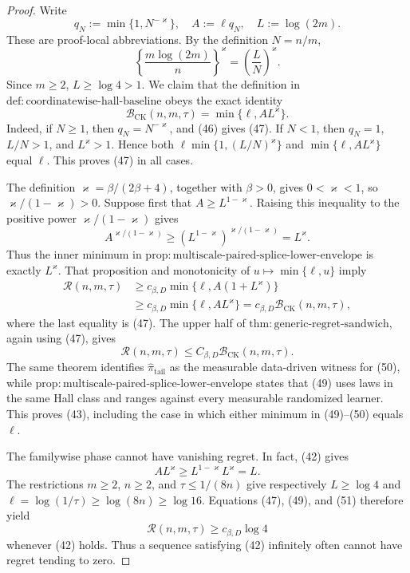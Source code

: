 \documentclass{article}
\begin{document}
\begin{proof}
Write
\[
q_N:=\min\{1,N^{-\varkappa}\},\quad
A:=\ell q_N,\quad L:=\log(2m).
\]
These are proof-local abbreviations. By the definition \(N=n/m\),
\[
\left\{\frac{m\log(2m)}n\right\}^{\varkappa}
=\left(\frac LN\right)^{\varkappa}.                                    \tag{46}
\]
Since \(m\geq2\), \(L\geq\log4>1\). We claim that the definition in \(\mathrm{def{:}coordinatewise\text{-}hall\text{-}baseline}\) obeys the exact identity
\[
\mathcal B_{\mathrm{CK}}(n,m,\tau)=\min\{\ell,AL^{\varkappa}\}.          \tag{47}
\]
Indeed, if \(N\geq1\), then \(q_N=N^{-\varkappa}\), and (46) gives (47). If \(N<1\), then \(q_N=1\), \(L/N>1\), and \(L^{\varkappa}>1\). Hence both
\(\ell\min\{1,(L/N)^{\varkappa}\}\) and \(\min\{\ell,AL^{\varkappa}\}\) equal \(\ell\). This proves (47) in all cases.

The definition \(\varkappa=\beta/(2\beta+4)\), together with \(\beta>0\), gives \(0<\varkappa<1\), so \(\varkappa/(1-\varkappa)>0\). Suppose first that \(A\geq L^{1-\varkappa}\). Raising this inequality to the positive power \(\varkappa/(1-\varkappa)\) gives
\[
A^{\varkappa/(1-\varkappa)}\geq
\left(L^{1-\varkappa}\right)^{\varkappa/(1-\varkappa)}=L^{\varkappa}.   \tag{48}
\]
Thus the inner minimum in \(\mathrm{prop{:}multiscale\text{-}paired\text{-}splice\text{-}lower\text{-}envelope}\) is exactly \(L^{\varkappa}\). That proposition and monotonicity of \(u\mapsto\min\{\ell,u\}\) imply
\[
\begin{split}
\mathcal R(n,m,\tau)
&\geq c_{\beta,D}\min\{\ell,A(1+L^{\varkappa})\}\\
&\geq c_{\beta,D}\min\{\ell,AL^{\varkappa}\}
=c_{\beta,D}\mathcal B_{\mathrm{CK}}(n,m,\tau),                       \tag{49}
\end{split}
\]
where the last equality is (47). The upper half of \(\mathrm{thm{:}generic\text{-}regret\text{-}sandwich}\), again using (47), gives
\[
\mathcal R(n,m,\tau)
\leq C_{\beta,D}\mathcal B_{\mathrm{CK}}(n,m,\tau).                    \tag{50}
\]
The same theorem identifies \(\widehat\pi_{\mathrm{tail}}\) as the measurable data-driven witness for (50), while \(\mathrm{prop{:}multiscale\text{-}paired\text{-}splice\text{-}lower\text{-}envelope}\) states that (49) uses laws in the same Hall class and ranges against every measurable randomized learner. This proves (43), including the case in which either minimum in (49)--(50) equals \(\ell\).

The familywise phase cannot have vanishing regret. In fact, (42) gives
\[
AL^{\varkappa}\geq L^{1-\varkappa}L^{\varkappa}=L.                     \tag{51}
\]
The restrictions \(m\geq2\), \(n\geq2\), and \(\tau\leq1/(8n)\) give respectively \(L\geq\log4\) and \(\ell=\log(1/\tau)\geq\log(8n)\geq\log16\). Equations (47), (49), and (51) therefore yield
\[
\mathcal R(n,m,\tau)\geq c_{\beta,D}\log4                              \tag{52}
\]
whenever (42) holds. Thus a sequence satisfying (42) infinitely often cannot have regret tending to zero.


\end{proof}
\end{document}
